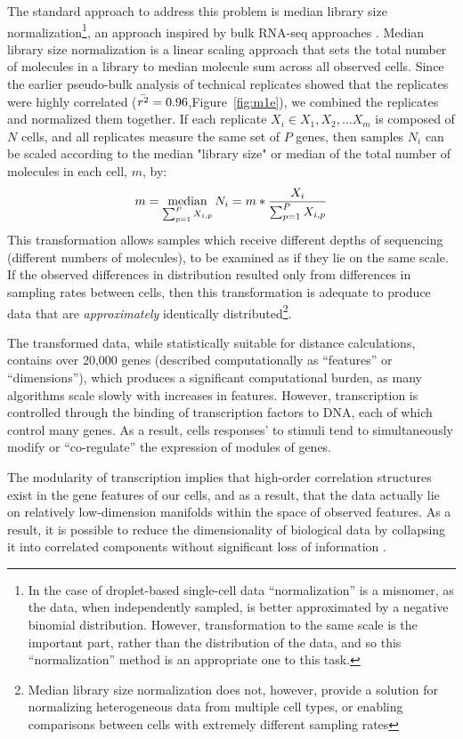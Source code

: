 The standard approach to address this problem is median library size normalization\footnote{In the case of droplet-based single-cell data ``normalization'' is a misnomer, as the data, when independently sampled, is better approximated by a negative binomial distribution. However, transformation to the same scale is the important part, rather than the distribution of the data, and so this ``normalization'' method is an appropriate one to this task.}, an approach inspired by bulk RNA-seq approaches \citep{Robinson2010}.
Median library size normalization is a linear scaling approach that sets the total number of molecules in a library to median molecule sum across all observed cells. 
Since the earlier pseudo-bulk analysis of technical replicates showed that the replicates were highly correlated ($\bar{r^2} = 0.96$,Figure~\ref{fig:m1e}), we combined the replicates and normalized them together.  
If each replicate $X_i \in {X_1, X_2, \ldots X_m}$ is composed of $N$ cells, and all replicates measure the same set of $P$ genes, then samples $N_i$ can be scaled according to the median "library size" or median of the total number of molecules in each cell, $m$, by: 
\[
  m = \operatorname*{median}_{\sum_{p=1}^{P}{X_{i,p}}}
  N_i = m * \frac{X_i}{\sum_{p=1}^{P}{X_{i,p}}}
\]
This transformation allows samples which receive different depths of sequencing (different numbers of molecules), to be examined as if they lie on the same scale.
If the observed differences in distribution resulted only from differences in sampling rates between cells, then this transformation is adequate to produce data that are \textit{approximately} identically distributed\footnote{Median library size normalization does not, however, provide a solution for normalizing heterogeneous data from multiple cell types, or enabling comparisons between cells with extremely different sampling rates\citep{Anders2010a}}. 

The transformed data, while statistically suitable for distance calculations, contains over 20,000 genes (described computationally as ``features'' or ``dimensions''), which produces a significant computational burden, as many algorithms scale slowly with increases in features.
However, transcription is controlled through the binding of transcription factors to DNA, each of which control many genes. %
As a result, cells responses' to stimuli tend to simultaneously modify or ``co-regulate'' the expression of modules of genes. 

The modularity of transcription implies that high-order correlation structures exist in the gene features of our cells, and as a result, that the data actually lie on relatively low-dimension manifolds within the space of observed features. 
As a result, it is possible to reduce the dimensionality of biological data by collapsing it into correlated components without significant loss of information \citep{Segal2004,Hartwell1999}.  

